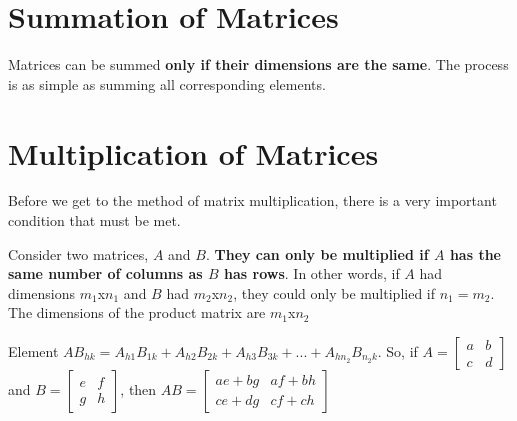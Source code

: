 \documentclass{report}
\begin{document}
\section{Summation of Matrices}

Matrices can be summed \textbf{only if their dimensions are the same}. The process is as simple as summing all corresponding elements.


\section{Multiplication of Matrices}

Before we get to the method of matrix multiplication, there is a very important condition that must be met.

Consider two matrices, $A$ and $B$. \textbf{They can only be multiplied if $A$ has the same number of columns as $B$ has rows}. In other words, if $A$ had dimensions $m_1$x$n_1$ and $B$ had $m_2$x$n_2$, they could only be multiplied if $n_1=m_2$. The dimensions of the product matrix are $m_1$x$n_2$

Element $AB_{hk}=A_{h1}B_{1k}+A_{h2}B_{2k}+A_{h3}B_{3k}+...+A_{hn_2}B_{n_2k}$. So, if 
$
    A=
    \begin{bmatrix}
        a & b \\
        c & d
    \end{bmatrix}
$ 
and 
$
    B=
    \begin{bmatrix}
        e & f \\
        g & h
    \end{bmatrix}
$, 
then 
$
    AB=
    \begin{bmatrix}
        ae+bg & af+bh \\
        ce+dg & cf+ch
    \end{bmatrix}
$
\end{document}
